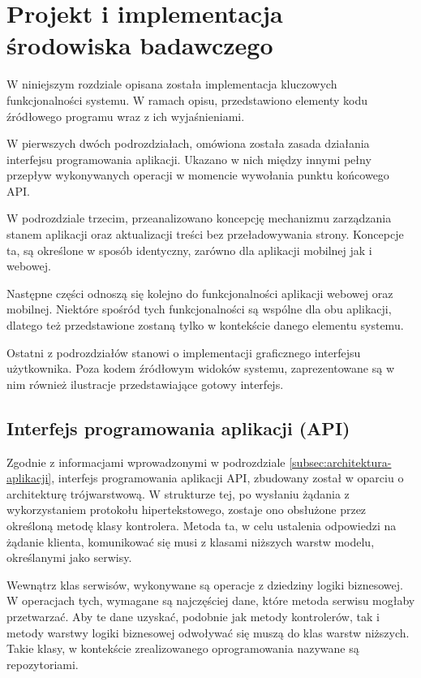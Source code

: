 \chapter{Projekt i implementacja środowiska badawczego}
\label{chap:implementacja-systemu}
W niniejszym rozdziale opisana została implementacja kluczowych funkcjonalności systemu. W ramach opisu, przedstawiono elementy kodu źródłowego programu wraz z ich wyjaśnieniami.

W pierwszych dwóch podrozdziałach, omówiona została zasada działania interfejsu programowania aplikacji. Ukazano w nich między innymi pełny przepływ wykonywanych operacji w momencie wywołania punktu końcowego API.

W podrozdziale trzecim, przeanalizowano koncepcję mechanizmu zarządzania stanem aplikacji oraz aktualizacji treści bez przeładowywania strony. Koncepcje ta, są określone w sposób identyczny, zarówno dla aplikacji mobilnej jak i webowej.

Następne części odnoszą się kolejno do funkcjonalności aplikacji webowej oraz mobilnej. Niektóre spośród tych funkcjonalności są wspólne dla obu aplikacji, dlatego też przedstawione zostaną tylko w kontekście danego elementu systemu.

Ostatni z podrozdziałów stanowi o implementacji graficznego interfejsu użytkownika. Poza kodem źródłowym widoków systemu, zaprezentowane są w nim również ilustracje przedstawiające gotowy interfejs.

\section{Interfejs programowania aplikacji (API)}
\label{sec:api-implementacja}
Zgodnie z informacjami wprowadzonymi w podrozdziale \ref{subsec:architektura-aplikacji}, interfejs programowania aplikacji API, zbudowany został w oparciu o architekturę trójwarstwową. W strukturze tej, po wysłaniu żądania z wykorzystaniem protokołu hipertekstowego, zostaje ono obsłużone przez określoną metodę klasy kontrolera. Metoda ta, w celu ustalenia odpowiedzi na żądanie klienta, komunikować się musi z klasami niższych warstw modelu, określanymi jako serwisy.

Wewnątrz klas serwisów, wykonywane są operacje z dziedziny logiki biznesowej. W operacjach tych, wymagane są najczęściej dane, które metoda serwisu mogłaby przetwarzać. Aby te dane uzyskać, podobnie jak metody kontrolerów, tak i metody warstwy logiki biznesowej odwoływać się muszą do klas warstw niższych. Takie klasy, w kontekście zrealizowanego oprogramowania nazywane są repozytoriami.

